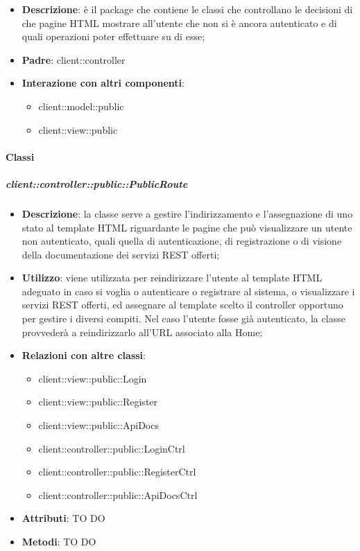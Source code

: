 \begin{itemize}
	\item \textbf{Descrizione}: è il package che contiene le classi che controllano le decisioni di che pagine HTML mostrare all'utente che non si è ancora autenticato e di quali operazioni poter effettuare su di esse;
	\item \textbf{Padre}: client::controller
	\item \textbf{Interazione con altri componenti}:
		\begin{itemize}
			\item client::model::public
			\item client::view::public
		\end{itemize}
\end{itemize}

	\paragraph{Classi} %
		\subparagraph{client::controller::public::PublicRoute} %
		\label{subp:bdsm_app_client_controller_public_publicrouteconfig}
		\begin{itemize}
			\item \textbf{Descrizione}: la classe serve a gestire l'indirizzamento e l'assegnazione di uno stato al template HTML riguardante le pagine che può visualizzare un utente non autenticato, quali quella di autenticazione, di registrazione o di visione della documentazione dei servizi REST offerti;
			\item \textbf{Utilizzo}: viene utilizzata per reindirizzare l'utente al template HTML adeguato in caso si voglia o autenticare o registrare al sistema, o visualizzare i servizi REST offerti, ed assegnare al template scelto il controller opportuno per gestire i diversi compiti. Nel caso l'utente fosse già autenticato, la classe provvederà a reindirizzarlo all'URL associato alla Home;
			\item \textbf{Relazioni con altre classi}:
				\begin{itemize}
					\item client::view::public::Login
					\item client::view::public::Register
					\item client::view::public::ApiDocs
					\item client::controller::public::LoginCtrl
					\item client::controller::public::RegisterCtrl
					\item client::controller::public::ApiDocsCtrl
				\end{itemize}
				\item \textbf{Attributi}: TO DO
				\item \textbf{Metodi}: TO DO
		\end{itemize}

